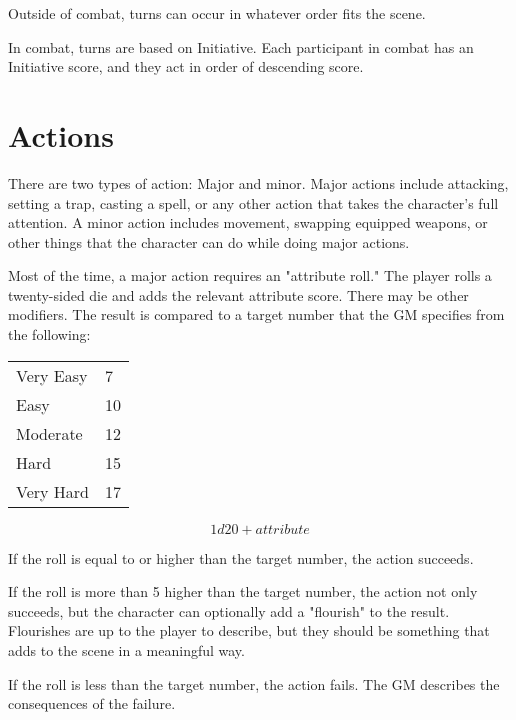 \begin{multicols}{2}
Outside of combat, turns can occur in whatever order fits the
scene.

In combat, turns are based on Initiative. Each participant in combat
has an Initiative score, and they act in order of descending score.

\section{Actions}

There are two types of action: Major and minor. Major actions
include attacking, setting a trap, casting a spell, or any other
action that takes the character's full attention. A minor action
includes movement, swapping equipped weapons, or other things
that the character can do while doing major actions.

Most of the time, a major action requires an "attribute roll." The
player rolls a twenty-sided die and adds the relevant attribute
score. There may be other modifiers. The result is compared to
a target number that the GM specifies from the following:

\begin{center}
{
\begin{xtabular}{|l|l|}
Very Easy & 7 \\
Easy & 10 \\
Moderate & 12 \\
Hard & 15 \\
Very Hard & 17 \\
\hline
\end{xtabular}
}
\end{center}

$$1d20 + attribute$$

If the roll is equal to or higher than the target number, the action
succeeds.

If the roll is more than 5 higher than the target number, the action
not only succeeds, but the character can optionally add a "flourish"
to the result. Flourishes are up to the player to describe, but they
should be something that adds to the scene in a meaningful way. 

If the roll is less than the target number, the action fails. The GM
describes the consequences of the failure.


\end{multicols}
